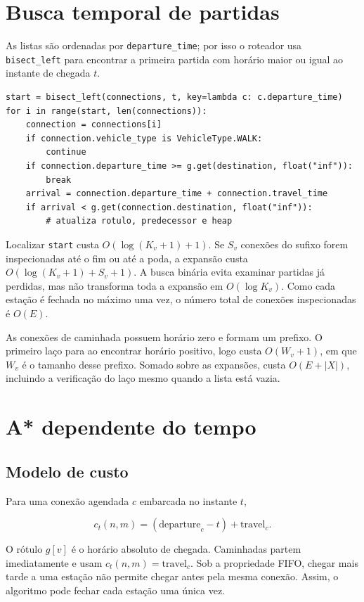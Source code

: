 \documentclass[11pt,a4paper]{article}
\begin{document}
\section{Busca temporal de partidas}

As listas são ordenadas por \texttt{departure\_time}; por isso o roteador usa
\texttt{bisect\_left} para encontrar a primeira partida com horário maior ou
igual ao instante de chegada $t$.

\begin{lstlisting}[caption={Busca e varredura em \texttt{backend/app/route\_simulator.py:107--124}.}]
start = bisect_left(connections, t, key=lambda c: c.departure_time)
for i in range(start, len(connections)):
    connection = connections[i]
    if connection.vehicle_type is VehicleType.WALK:
        continue
    if connection.departure_time >= g.get(destination, float("inf")):
        break
    arrival = connection.departure_time + connection.travel_time
    if arrival < g.get(connection.destination, float("inf")):
        # atualiza rotulo, predecessor e heap
\end{lstlisting}

Localizar \texttt{start} custa $O(\log(K_v+1)+1)$. Se $S_v$ conexões do sufixo forem
inspecionadas até o fim ou até a poda, a expansão custa
$O(\log(K_v+1)+S_v+1)$. A busca binária evita examinar partidas já perdidas, mas não
transforma toda a expansão em $O(\log K_v)$. Como cada estação é fechada no
máximo uma vez, o número total de conexões inspecionadas é $O(E)$.

As conexões de caminhada possuem horário zero e formam um prefixo. O primeiro
laço para ao encontrar horário positivo, logo custa $O(W_v+1)$, em que $W_v$ é o
tamanho desse prefixo. Somado sobre as expansões, custa $O(E+|X|)$, incluindo
a verificação do laço mesmo quando a lista está vazia.

\section{A* dependente do tempo}

\subsection{Modelo de custo}

Para uma conexão agendada $c$ embarcada no instante $t$,

\[
c_t(n,m)=(\text{departure}_c-t)+\text{travel}_c.
\]

O rótulo $g[v]$ é o horário absoluto de chegada. Caminhadas partem
imediatamente e usam $c_t(n,m)=\text{travel}_c$. Sob a propriedade FIFO, chegar
mais tarde a uma estação não permite chegar antes pela mesma conexão. Assim, o
algoritmo pode fechar cada estação uma única vez.
\end{document}
